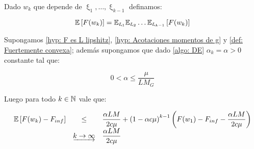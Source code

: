 Dado $w_k$ que depende de $\upxi_{1}, \dots, \upxi_{k-1}$ definamos:

\begin{equation*}
	\label{def: esperanza total}
	\mathbb{E} \left[F(w_k)\right] = \mathbb{E}_{\upxi_{1}}\mathbb{E}_{\upxi_{2}}\dots \mathbb{E}_{\upxi_{k-1}}\left[F(w_k)\right]
\end{equation*}

\begin{theorem}
	\label{theorem: DE en fuertemente convexo y alfa fijo converge en l1}
	Supongamos \ref{hyp: F es L lipshitz}, \ref{hyp: Acotaciones momentos de g} y \ref{def: Fuertemente convexa}; adem\'as supongamos que dado \ref{algo: DE} $\alpha_k = \alpha >0 $ constante tal que:
	
	\begin{equation}
	\label{eq: Condicion alfa Conv L1 fuertemente convexo}
	0  < \alpha \leq \dfrac{\mu}{LM_G} 
	\end{equation}
	
	Luego para todo $k \in {\mathbb{N}}$ vale que:
	
	\begin{equation*}
	\begin{array}{rcl}
	\mathbb{E} \left[F(w_k) - F_{inf}\right] & \leq & \dfrac{\alpha LM}{2 c \mu} + \left(1 - \alpha c \mu \right)^{k-1} \left(F(w_1) - F_{inf} - \dfrac{\alpha LM}{2 c \mu} \right) \\
	& \underrightarrow{k \rightarrow \infty} & \dfrac{\alpha LM}{2 c \mu} 
	\end{array}
	\end{equation*}
	 
\end{theorem}

